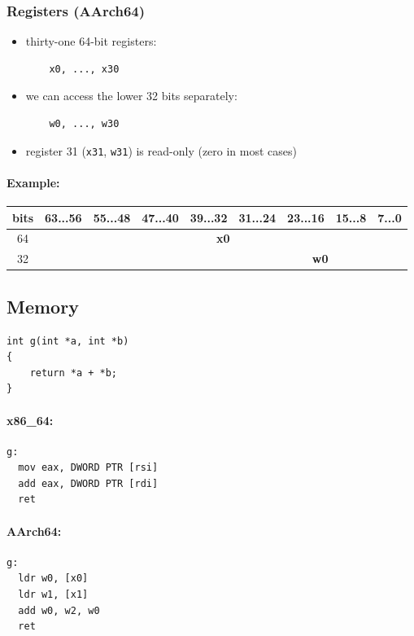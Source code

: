 \documentclass[12pt]{article}
\begin{document}
\subsubsection{Registers (AArch64)}

\begin{itemize}
    \item thirty-one 64-bit registers:
    \begin{lstlisting}
    x0, ..., x30
    \end{lstlisting}
    
    \item we can access the lower 32 bits separately:
    \begin{lstlisting}
    w0, ..., w30
    \end{lstlisting}
    
    \item register 31 (\texttt{x31}, \texttt{w31}) is read-only (zero in most cases)
\end{itemize}

\paragraph{Example:}
\begin{tabular}{|c|c|c|c|c|c|c|c|c|}
\hline
\textbf{bits} & 63...56 & 55...48 & 47...40 & 39...32 & 31...24 & 23...16 & 15...8 & 7...0 \\
\hline
64 &  \multicolumn{8}{|c|}{\textbf{x0}} \\
\hline
32 &  &  &  &  & \multicolumn{4}{|c|}{\textbf{w0}} \\
\hline
\end{tabular}
\subsection{Memory}
\begin{lstlisting}
int g(int *a, int *b)
{
    return *a + *b;
}
\end{lstlisting}

\paragraph{x86\_64:}
\begin{lstlisting}
g:
  mov eax, DWORD PTR [rsi]
  add eax, DWORD PTR [rdi]
  ret
\end{lstlisting}

\paragraph{AArch64:}
\begin{lstlisting}
g:
  ldr w0, [x0]
  ldr w1, [x1]
  add w0, w2, w0
  ret
\end{lstlisting}
\end{document}

